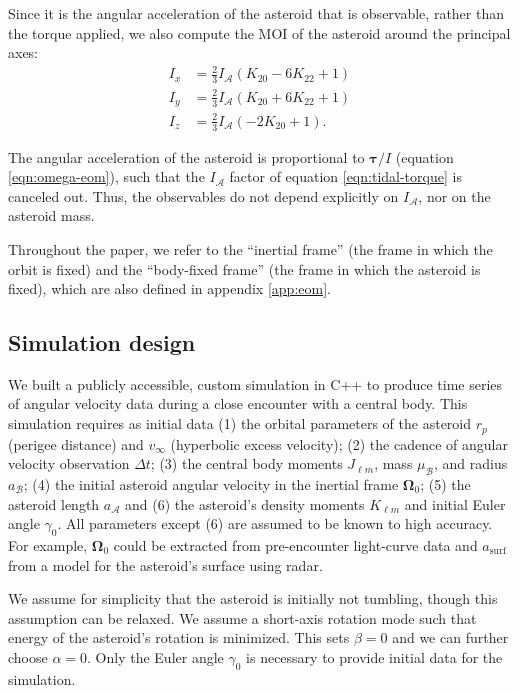 \documentclass[fleqn,usenatbib]{mnras}
\newcommand{\parens}[1]{\left( #1 \right)}
\begin{document}
Since it is the angular acceleration of the asteroid that is observable, rather than the torque applied, we also compute the MOI of the asteroid around the principal axes: 
\begin{equation}
  \begin{split}
    I_x &= \frac{2}{3} I_\mathcal{A} \parens{K_{20} - 6 K_{22} + 1}\\
    I_y &= \frac{2}{3} I_\mathcal{A} \parens{K_{20} + 6 K_{22} + 1}\\
    I_z &= \frac{2}{3} I_\mathcal{A} \parens{-2K_{20} + 1}.
  \end{split}
  \label{eqn:moi}
\end{equation}

The angular acceleration of the asteroid is proportional to $\bm \tau / I$ (equation \ref{eqn:omega-eom}), such that the $I_\mathcal{A}$ factor of equation \ref{eqn:tidal-torque} is canceled out. Thus, the observables do not depend explicitly on $I_\mathcal{A}$, nor on the asteroid mass.

Throughout the paper, we refer to the ``inertial frame'' (the frame in which the orbit is fixed) and the ``body-fixed frame'' (the frame in which the asteroid is fixed), which are also defined in appendix \ref{app:eom}.

\subsection{Simulation design}
\label{sec:sim}

We built a publicly accessible, custom simulation in C++ to produce time series of angular velocity data during a close encounter with a central body. This simulation requires as initial data (1) the orbital parameters of the asteroid $r_p$ (perigee distance) and $v_\infty$ (hyperbolic excess velocity); (2) the cadence of angular velocity observation $\Delta t$; (3) the central body moments $J_{\ell m}$, mass $\mu_\mathcal{B}$, and radius $a_\mathcal{B}$; (4) the initial asteroid angular velocity in the inertial frame $\bm \Omega_0$; (5) the asteroid length $a_\mathcal{A}$ and (6) the asteroid's density moments $K_{\ell m}$ and initial Euler angle $\gamma_0$. All parameters except (6) are assumed to be known to high accuracy. For example, $\bm \Omega_0$ could be extracted from pre-encounter light-curve data and $a_\text{surf}$ from a model for the asteroid's surface using radar.

We assume for simplicity that the asteroid is initially not tumbling, though this assumption can be relaxed. We assume a short-axis rotation mode such that energy of the asteroid's rotation is minimized. This sets $\beta = 0$ and we can further choose $\alpha = 0$. Only the Euler angle $\gamma_0$ is necessary to provide initial data for the simulation.
\end{document}
